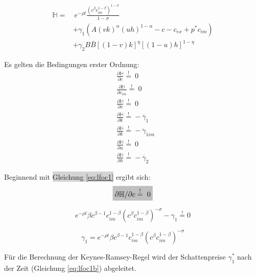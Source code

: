 	\begin{equation}
		\begin{split}
			\mathbb{H}=&~e^{-\rho t}\frac{(c^\beta c_{im}^{1-\beta})^{1-\sigma}}{1-\sigma}\\
			&+\gamma_1(A(vk)^\alpha(uh)^{1-\alpha}-c-c_{ex}+p^*c_{im})\\
			&+\gamma_2B\bar{B}[(1-v)k]^{\eta}[(1-u)h]^{1-\eta}
		\end{split}
	\end{equation}


Es gelten die Bedingungen erster Ordnung:\\


	\begin{align}
		&\frac{\partial\mathbb{H}}{\partial c}\overset{!}{=}~0\label{eq:lfoc1}\\
		&\frac{\partial\mathbb{H}}{\partial c_{im}}\overset{!}{=}~0\label{eq:lfoc1im}\\
		&\frac{\partial\mathbb{H}}{\partial v}\overset{!}{=}~0\label{eq:lfoc2}\\
		&\frac{\partial\mathbb{H}}{\partial k}\overset{!}{=}-\dot{\gamma_1}\label{eq:lfoc3}\\
		&\frac{\partial\mathbb{H}}{\partial k}\overset{!}{=}-\dot{\gamma}_{1im}\label{eq:lfoc3im}\\
		&\frac{\partial\mathbb{H}}{\partial u}\overset{!}{=}~0\label{eq:lfoc4}\\
		&\frac{\partial\mathbb{H}}{\partial h}\overset{!}{=}-\dot{\gamma_2}\label{eq:lfoc5}
	\end{align}


Beginnend mit \colorbox{lightgray}{Gleichung \eqref{eq:lfoc1}} ergibt sich:\\


	\begin{equation*}
		\colorbox{lightgray}{$\partial\mathbb{H}/\partial c\overset{!}{=}~0$}
	\end{equation*}


	\begin{equation}
		e^{-\rho t}\beta c^{\beta-1}c_{im}^{1-\beta}(c^\beta c_{im}^{1-\beta})^{-\sigma}-\gamma_1\overset{!}{=}0\label{eq:lfoc1a}
	\end{equation}


	\begin{equation}
		\gamma_1=e^{-\rho t}\beta c^{\beta-1}c_{im}^{1-\beta}(c^\beta c_{im}^{1-\beta})^{-\sigma}\label{eq:lfoc1b}
	\end{equation}


Für die Berechnung der Keynes-Ramsey-Regel wird der Schattenpreise $\gamma_1^*$ nach der Zeit (Gleichung \eqref{eq:lfoc1b}) abgeleitet.


